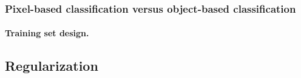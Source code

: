 \subsubsection{Pixel-based classification versus object-based classification}






\paragraph{Training set design. \\}



\subsection{Regularization}

\stopcontents[chapters]